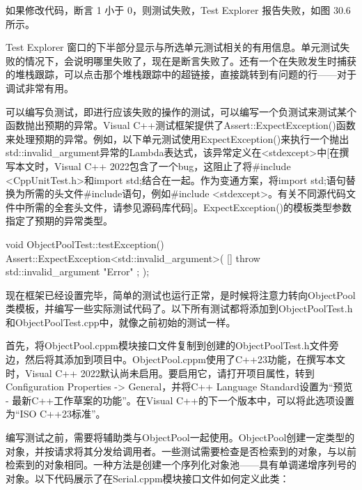 
如果修改代码，断言 1 小于 0，则测试失败，Test Explorer 报告失败，如图 30.6 所示。


Test Explorer 窗口的下半部分显示与所选单元测试相关的有用信息。单元测试失败的情况下，会说明哪里失败了，现在是断言失败了。还有一个在失败发生时捕获的堆栈跟踪，可以点击那个堆栈跟踪中的超链接，直接跳转到有问题的行——对于调试非常有用。


可以编写负测试，即进行应该失败的操作的测试，可以编写一个负测试来测试某个函数抛出预期的异常。Visual C++测试框架提供了Assert::ExpectException()函数来处理预期的异常。例如，以下单元测试使用ExpectException()来执行一个抛出std::invalid\_argument异常的Lambda表达式，该异常定义在<stdexcept>中[在撰写本文时，Visual C++ 2022包含了一个bug，这阻止了将\#include <CppUnitTest.h>和import std;结合在一起。作为变通方案，将import std;语句替换为所需的头文件\#include语句，例如\#include <stdexcept>。有关不同源代码文件中所需的全套头文件，请参见源码库代码]。ExpectException()的模板类型参数指定了预期的异常类型。

\begin{cpp}
void ObjectPoolTest::testException()
{
    Assert::ExpectException<std::invalid_argument>(
        []{ throw std::invalid_argument { "Error" }; });
}
\end{cpp}


现在框架已经设置完毕，简单的测试也运行正常，是时候将注意力转向ObjectPool类模板，并编写一些实际测试代码了。以下所有测试都将添加到ObjectPoolTest.h和ObjectPoolTest.cpp中，就像之前初始的测试一样。

首先，将ObjectPool.cppm模块接口文件复制到创建的ObjectPoolTest.h文件旁边，然后将其添加到项目中。ObjectPool.cppm使用了C++23功能，在撰写本文时，Visual C++ 2022默认尚未启用。要启用它，请打开项目属性，转到Configuration Properties -> General，并将C++ Language Standard设置为“预览 - 最新C++工作草案的功能”。在Visual C++的下一个版本中，可以将此选项设置为“ISO C++23标准”。

编写测试之前，需要将辅助类与ObjectPool一起使用。ObjectPool创建一定类型的对象，并按请求将其分发给调用者。一些测试需要检查是否检索到的对象，与以前检索到的对象相同。一种方法是创建一个序列化对象池——具有单调递增序列号的对象。以下代码展示了在Serial.cppm模块接口文件如何定义此类：

